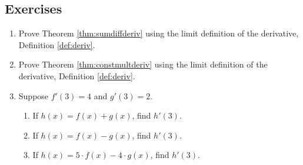 \subsection{Exercises}
\begin{enumerate}
    \item Prove Theorem \ref{thm:sumdiffderiv} using the limit definition of the derivative, Definition \ref{def:deriv}.
    \item Prove Theorem \ref{thm:constmultderiv} using the limit definition of the derivative, Definition \ref{def:deriv}.
    \item Suppose $f'(3) = 4$ and $g'(3) = 2$.
    \begin{enumerate}
    \item If $h(x) = f(x) + g(x)$, find $h'(3)$.
    \item If $h(x) = f(x) - g(x)$, find $h'(3)$.
    \item If $h(x) = 5\cdot f(x) - 4\cdot g(x)$, find $h'(3)$.
    \end{enumerate}
\end{enumerate}
